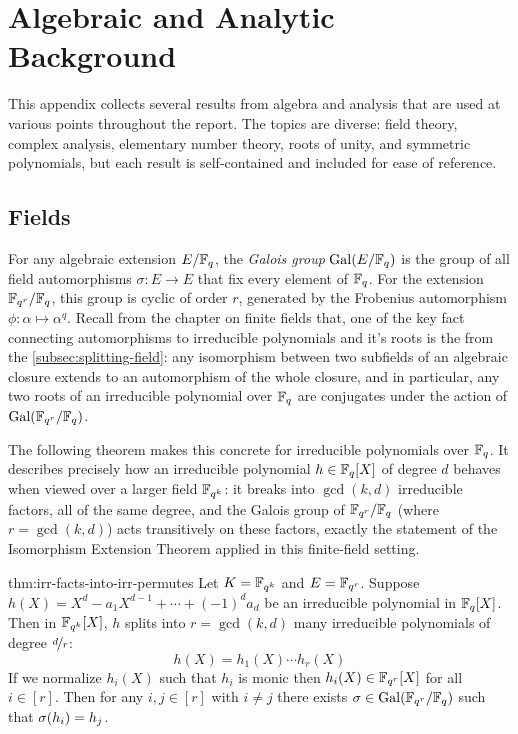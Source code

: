 \chapter{Algebraic and Analytic Background}
\label{chap:background}

This appendix collects several results from algebra and analysis that are used at various points throughout the report. The topics are diverse: field theory, complex analysis, elementary number theory, roots of unity, and symmetric polynomials, but each result is self-contained and included for ease of reference.

\section{Fields}

For any algebraic extension $E/\mathbb{F}_q$, the \emph{Galois group} $\operatorname{Gal}(E/\mathbb{F}_q)$ is the group of all field automorphisms $\sigma: E \to E$ that fix every element of $\mathbb{F}_q$. For the extension $\mathbb{F}_{q^r}/\mathbb{F}_q$, this group is cyclic of order $r$, generated by the Frobenius automorphism $\phi: \alpha \mapsto \alpha^q$. Recall from the chapter on finite fields that, one of the key fact connecting automorphisms to irreducible polynomials and it's roots is the \IsoExtthm from the \autoref{subsec:splitting-field}: any isomorphism between two subfields of an algebraic closure extends to an automorphism of the whole closure, and in particular, any two roots of an irreducible polynomial over $\mathbb{F}_q$ are conjugates under the action of $\operatorname{Gal}(\mathbb{F}_{q^r}/\mathbb{F}_q)$.

The following theorem makes this concrete for irreducible polynomials over $\mathbb{F}_q$. It describes precisely how an irreducible polynomial $h\in\mathbb{F}_q[X]$ of degree $d$ behaves when viewed over a larger field $\mathbb{F}_{q^k}$: it breaks into $\gcd(k,d)$ irreducible factors, all of the same degree, and the Galois group of $\mathbb{F}_{q^r}/\mathbb{F}_q$ (where $r=\gcd(k,d)$) acts transitively on these factors, exactly the statement of the Isomorphism Extension Theorem applied in this finite-field setting.

\begin{Theorem}{}{thm:irr-facts-into-irr-permutes}
  Let $K=\mathbb{F}_{q^k}$ and $E=\mathbb{F}_{q^r}$. Suppose $h(X)=X^d-a_1X^{d-1}+\cdots+(-1)^da_d$ be an irreducible polynomial in $\mathbb{F}_q[X]$. Then in $\mathbb{F}_{q^k}[X]$, $h$ splits into $r=\gcd(k,d)$ many irreducible polynomials of degree $\nicefrac{d}{r}$: $$h(X)=h_1(X)\cdots h_r(X)$$If we normalize $h_i(X)$ such that $h_i$ is monic then $h_i(X)\in\mathbb{F}_{q^r}[X]$ for all $i\in[r]$. Then for any $i,j\in[r]$ with $i\neq j$ there exists $\sigma\in\operatorname{Gal}(\mathbb{F}_{q^r}/\mathbb{F}_q)$ such that $\sigma(h_i)=h_j$.
\end{Theorem}

